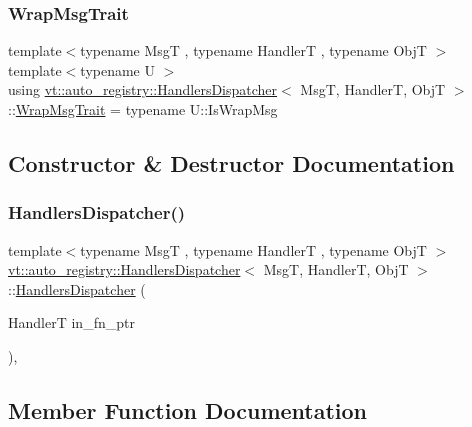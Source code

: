 \subsubsection{\texorpdfstring{Wrap\+Msg\+Trait}{WrapMsgTrait}}
{\footnotesize\ttfamily template$<$typename MsgT , typename HandlerT , typename ObjT $>$ \\
template$<$typename U $>$ \\
using \hyperlink{structvt_1_1auto__registry_1_1_handlers_dispatcher}{vt\+::auto\+\_\+registry\+::\+Handlers\+Dispatcher}$<$ MsgT, HandlerT, ObjT $>$\+::\hyperlink{structvt_1_1auto__registry_1_1_handlers_dispatcher_a316ed070238aa9a3bc8dd3f8d00109f2}{Wrap\+Msg\+Trait} =  typename U\+::\+Is\+Wrap\+Msg}



\subsection{Constructor \& Destructor Documentation}
\mbox{\label{structvt_1_1auto__registry_1_1_handlers_dispatcher_aea820469903ae2c06a6e9934d3e8d0cc}} 
\subsubsection{\texorpdfstring{Handlers\+Dispatcher()}{HandlersDispatcher()}}
{\footnotesize\ttfamily template$<$typename MsgT , typename HandlerT , typename ObjT $>$ \\
\hyperlink{structvt_1_1auto__registry_1_1_handlers_dispatcher}{vt\+::auto\+\_\+registry\+::\+Handlers\+Dispatcher}$<$ MsgT, HandlerT, ObjT $>$\+::\hyperlink{structvt_1_1auto__registry_1_1_handlers_dispatcher}{Handlers\+Dispatcher} (\begin{DoxyParamCaption}\item[{HandlerT}]{in\+\_\+fn\+\_\+ptr }\end{DoxyParamCaption})\hspace{0.3cm}{\ttfamily [inline]}, {\ttfamily [explicit]}}



\subsection{Member Function Documentation}
\mbox{\label{structvt_1_1auto__registry_1_1_handlers_dispatcher_a2011677dbfc1c7f8425066c4311c53ce}} 
